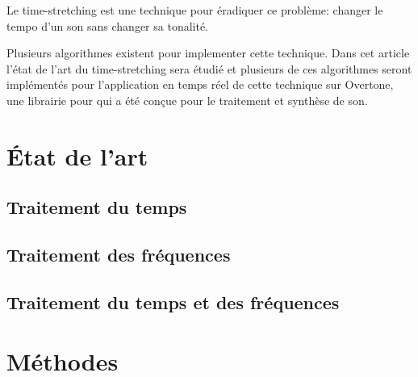 \documentclass[letterpaper]{article}
\begin{document}
  Le time-stretching est une technique pour éradiquer ce problème: changer le tempo d'un
  son sans changer sa tonalité.

  Plusieurs algorithmes existent pour implementer cette technique. Dans cet article l'état de
  l'art du time-stretching sera étudié et plusieurs de ces algorithmes seront
  implémentés pour l'application en temps réel de cette technique sur Overtone, une librairie pour
  qui a été conçue pour le traitement et synthèse de son. 

\section{État de l'art}

\subsection{Traitement du temps}

\subsection{Traitement des fréquences}

\subsection{Traitement du temps et des fréquences}

\section{Méthodes}
\end{document}
